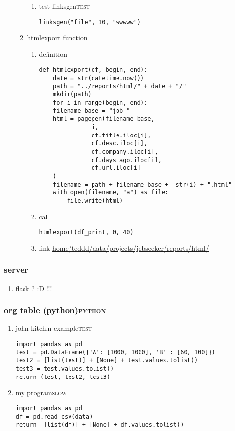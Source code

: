 \documentclass[11pt]{article}
\begin{document}
\begin{enumerate}
\begin{enumerate}
\begin{enumerate}
\item test linksgen\hfill{}\textsc{test}
\label{sec:org9617706}
\begin{verbatim}
linksgen("file", 10, "wwwww")
\end{verbatim}
\end{enumerate}
\item htmlexport function
\label{sec:org6aa6727}
\begin{enumerate}
\item definition
\label{sec:org40b5f0d}
\begin{verbatim}
def htmlexport(df, begin, end):
    date = str(datetime.now())
    path = "../reports/html/" + date + "/"
    mkdir(path)
    for i in range(begin, end):
	filename_base = "job-"
	html = pagegen(filename_base,
		       i,
		       df.title.iloc[i],
		       df.desc.iloc[i],
		       df.company.iloc[i],
		       df.days_ago.iloc[i],
		       df.url.iloc[i]
	)
	filename = path + filename_base +  str(i) + ".html"
	with open(filename, "a") as file:
	    file.write(html)

\end{verbatim}

\item call
\label{sec:orgdcf7a2c}
\begin{verbatim}
htmlexport(df_print, 0, 40)
\end{verbatim}

\item link
\label{sec:org2f6ff40}
\url{home/teddd/data/projects/jobseeker/reports/html/}
\end{enumerate}
\end{enumerate}
\end{enumerate}
\subsubsection{server}
\label{sec:org9de03f6}
\begin{enumerate}
\item flask ? :D !!!
\label{sec:org178132b}
\end{enumerate}
\subsubsection{org  table (python)\hfill{}\textsc{python}}
\label{sec:org58e4d72}
\begin{enumerate}
\item john kitchin example\hfill{}\textsc{test}
\label{sec:orgd508bfb}
\begin{verbatim}
import pandas as pd
test = pd.DataFrame({'A': [1000, 1000], 'B' : [60, 100]})
test2 = [list(test)] + [None] + test.values.tolist()
test3 = test.values.tolist()
return (test, test2, test3)
\end{verbatim}

\item my program\hfill{}\textsc{slow}
\label{sec:org726a17e}
\begin{verbatim}
import pandas as pd
df = pd.read_csv(data)
return  [list(df)] + [None] + df.values.tolist()
\end{verbatim}
\end{enumerate}
\end{document}
